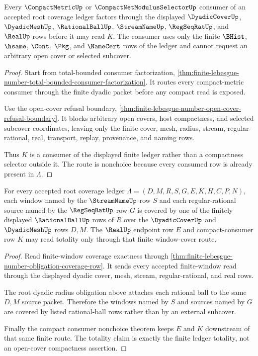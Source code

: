 \begin{theorem}
\label{thm:finite-lebesgue-number-root-compact-consumer-nonchoice}
Every $\CompactMetricUp$ or $\CompactNetModulusSelectorUp$ consumer of an accepted root coverage ledger factors through the displayed $\DyadicCoverUp$, $\DyadicMeshUp$, $\RationalBallUp$, $\StreamNameUp$, $\RegSeqRatUp$, and $\RealUp$ rows before it may read $K$. The consumer uses only the finite $\BHist$, $\hsame$, $\Cont$, $\Pkg$, and $\NameCert$ rows of the ledger and cannot request an arbitrary open cover or selected subcover.
\end{theorem}
\begin{proof}
Start from total-bounded consumer factorization, \autoref{thm:finite-lebesgue-number-total-bounded-consumer-factorization}. It routes every compact-metric consumer through the finite dyadic packet before any compact read is exposed.

Use the open-cover refusal boundary, \autoref{thm:finite-lebesgue-number-open-cover-refusal-boundary}. It blocks arbitrary open covers, host compactness, and selected subcover coordinates, leaving only the finite cover, mesh, radius, stream, regular-rational, real, transport, replay, provenance, and naming rows.

Thus $K$ is a consumer of the displayed finite ledger rather than a compactness selector outside it. The route is nonchoice because every consumed row is already present in $\Lambda$.
\end{proof}

\begin{theorem}
\label{thm:finite-lebesgue-number-root-window-cover-totality}
For every accepted root coverage ledger $\Lambda=(D,M,R,S,G,E,K,H,C,P,N)$, each window named by the $\StreamNameUp$ row $S$ and each regular-rational source named by the $\RegSeqRatUp$ row $G$ is covered by one of the finitely displayed $\RationalBallUp$ rows of $R$ over the $\DyadicCoverUp$ and $\DyadicMeshUp$ rows $D,M$. The $\RealUp$ endpoint row $E$ and compact-consumer row $K$ may read totality only through that finite window-cover route.
\end{theorem}
\begin{proof}
Read finite-window coverage exactness through \autoref{thm:finite-lebesgue-number-obligation-coverage-row}. It sends every accepted finite-window read through the displayed dyadic cover, mesh, stream, regular-rational, and real rows.

The root dyadic radius obligation above attaches each rational ball to the same $D,M$ source packet. Therefore the windows named by $S$ and sources named by $G$ are covered by listed rational-ball rows rather than by an external subcover.

Finally the compact consumer nonchoice theorem keeps $E$ and $K$ downstream of that same finite route. The totality claim is exactly the finite ledger totality, not an open-cover compactness assertion.
\end{proof}

